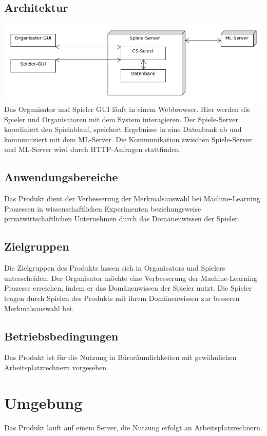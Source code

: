 \documentclass[a4paper]{scrreprt}
\begin{document}
    \section{Architektur}
    \includegraphics[width=\textwidth]{uml/export/Architektur.png}
    Das Organisator und Spieler GUI läuft in einem Webbrowser. Hier werden die Spieler und Organisatoren mit dem System interagieren. Der Spiele-Server koordiniert den Spielablauf, speichert Ergebnisse
    in eine Datenbank ab und kommuniziert mit dem ML-Server. Die Kommunikation zwischen Spiele-Server und ML-Server wird durch HTTP-Anfragen stattfinden.
    \section{Anwendungsbereiche}
    Das \Gls{Produkt} dient der Verbesserung der Merkmalsauswahl bei Machine-Learning Prozessen in wissenschaftlichen
    Experimenten beziehungsweise privatwirtschaftlichen Unternehmen durch das Domänenwissen der \Gls{Spieler}.

    \section{Zielgruppen}
    Die Zielgruppen des \Gls{Produkt}s lassen sich in \Glspl{Organisator} und \Glspl{Spieler} unterscheiden.
    Der Organisator möchte eine Verbesserung der Machine-Learning Prozesse erreichen, indem er das Domänenwissen der Spieler nutzt.
    Die Spieler tragen durch Spielen des \Gls{Produkt}s mit ihrem Domänenwissen zur besseren Merkmalsauswahl bei.

    \section{Betriebsbedingungen}
    Das \Gls{Produkt} ist für die Nutzung in Büroräumlichkeiten mit gewöhnlichen Arbeitsplatzrechnern vorgesehen.

    \chapter{Umgebung}
    Das \Gls{Produkt} läuft auf einem Server, die Nutzung erfolgt an Arbeitsplatzrechnern.
\end{document}
